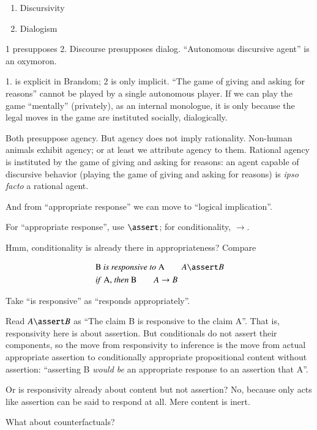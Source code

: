 \documentclass{article}
\begin{document}
\begin{enumerate}
\item Discursivity
\item Dialogism
\end{enumerate}

1 presupposes 2. Discourse presupposes dialog. ``Autonomous discursive
agent'' is an oxymoron.

1. is explicit in Brandom; 2 is only implicit. ``The game of giving
and asking for reasons'' cannot be played by a single autonomous
player. If we can play the game ``mentally'' (privately), as an
internal monologue, it is only because the legal moves in the game are
instituted socially, dialogically.

Both presuppose agency. But agency does not imply rationality.
Non-human animals exhibit agency; or at least we attribute agency to
them. Rational agency is instituted by the game of giving and asking
for reasons: an agent capable of discursive behavior (playing the game
of giving and asking for reasons) is \textit{ipso facto} a rational
agent.

And from ``appropriate response'' we can move to ``logical
implication''.

For ``appropriate response'', use \(\linfer\); for conditionality,
\(\rightarrow\).

Hmm, conditionality is already there in appropriateness? Compare

\begin{align}
 & \text{B \textit{is responsive to} A}\hskip2em A\linfer B \\
 & \text{\textit{if} A, \textit{then} B}\hskip2em A\rightarrow B
\end{align}

Take ``is responsive'' as ``responds appropriately''.

Read \(A\linfer B\) as ``The claim B is responsive to the claim A''.
That is, responsivity here is about assertion. But conditionals do not
assert their components, so the move from responsivity to inference is
the move from actual appropriate assertion to conditionally
appropriate propositional content without assertion: ``asserting B
\textit{would be} an appropriate response to an assertion that A''.

Or is responsivity already about content but not assertion? No,
because only acts like assertion can be said to respond at all. Mere
content is inert.

What about counterfactuals?
\end{document}
